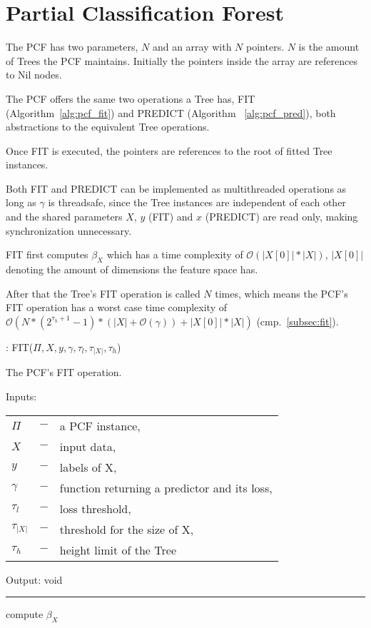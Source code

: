 \section{Partial Classification Forest}
\label{sec:pcf}

The PCF has two parameters, $N$ and an array with $N$
pointers. $N$ is the amount of Trees the PCF maintains.
Initially the pointers inside the array are references to
Nil nodes.

The PCF offers the same two operations a Tree has, FIT
(Algorithm~\ref{alg:pcf_fit}) and PREDICT (Algorithm~%
\ref{alg:pcf_pred}), both abstractions to the equivalent
Tree operations.

Once FIT is executed, the pointers are references to the
root of fitted Tree instances.

Both FIT and PREDICT can be implemented as multithreaded
operations as long as $\gamma$ is threadsafe, since the
Tree instances are independent of each other and the shared
parameters $X$, $y$ (FIT) and $x$ (PREDICT) are read only,
making synchronization unnecessary.

FIT first computes $\beta_X$ which has a time complexity of
$\mathcal{O}(|X[0]| * |X|)$, $|X[0]|$ denoting the amount
of dimensions the feature space has.

After that the Tree's FIT operation is called $N$ times,
which means the PCF's FIT operation has a worst case time
complexity of $\mathcal{O} (N * (2^{\tau_h + 1} - 1) *
(|X| + \mathcal{O}(\gamma)) + |X[0]| * |X|)$
(cmp.~\ref{subsec:fit}).

\begin{algorithm}
  \caption{: FIT($\Pi, X, y, \gamma, \tau_{l},
    \tau_{|X|}, \tau_{h}$)}%
  \label{alg:pcf_fit}
  The PCF's FIT operation.

  Inputs:

    \begin{tabu}{llX}
    $\Pi$ &$-$ &a PCF instance,\\
    $X$ &$-$ &input data,\\
    $y$ &$-$ &labels of X,\\
    $\gamma$ &$-$ &function returning a predictor and its
      loss,\\
    $\tau_{l}$ &$-$ &loss threshold,\\
    $\tau_{|X|}$ &$-$ &threshold for the size of X,\\
    $\tau_{h}$ &$-$ &height limit of the Tree
    \end{tabu}

  Output: void

  \noindent\rule{\linewidth}{0.4pt}

  \begin{algorithmic}[1]
    \STATE compute $\beta_X$
    \ENDFOR
  \end{algorithmic}
\end{algorithm}

